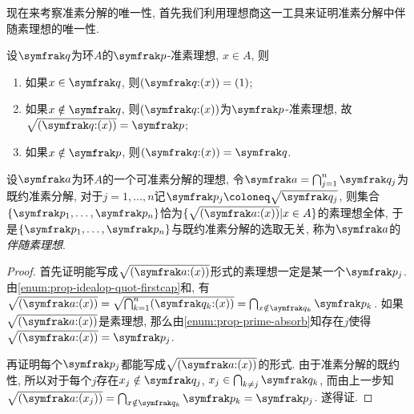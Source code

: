 现在来考察准素分解的唯一性, 首先我们利用理想商这一工具来证明准素分解中伴随素理想的唯一性.

\begin{propositionnoproof}\label{prop:idealquotprimary}
  设$\ideal{q}$为环$A$的$\ideal{p}$-准素理想, $x\in A$, 则
  \begin{enumerate}
    \item 如果$x\in \ideal{q}$, 则$(\ideal{q}{:}(x))=(1)$;
    \item 如果$x\notin\ideal{q}$, 则$(\ideal{q}{:}(x))$为$\ideal{p}$-准素理想, 故$\sqrt{(\ideal{q}{:}(x))}=\ideal{p}$;
    \item 如果$x\notin\ideal{p}$, 则$(\ideal{q}{:}(x))=\ideal{q}$.
  \end{enumerate}
\end{propositionnoproof}


\begin{theorem}\label{prop:primuniq1}
  设$\ideal{a}$为环$A$的一个可准素分解的理想, 令$\ideal{a}=\bigcap_{j=1}^n \ideal{q}_j$为既约准素分解, 对于$j=1, \dotsc, n$记$\ideal{p}_j\coloneq \sqrt{\ideal{q}_j}$, 则集合$\{\ideal{p}_1, \dotsc, \ideal{p}_n\}$恰为$\{\sqrt{(\ideal{a}{:}(x))}\vert x\in A\}$的素理想全体, 于是$\{\ideal{p}_1, \dotsc, \ideal{p}_n\}$与既约准素分解的选取无关, 称为$\ideal{a}$的\emph{伴随素理想}.
\end{theorem}

\begin{proof}
  首先证明能写成$\sqrt{(\ideal{a}{:}(x))}$形式的素理想一定是某一个$\ideal{p}_j$. 由\ref{enum:prop-idealop-quot-firstcap}和, 有$\sqrt{(\ideal{a}{:}(x))}=\sqrt{\bigcap_{k=1}^n(\ideal{q}_k{:}(x))}=\bigcap_{x\notin\ideal{q}_k}\ideal{p}_k$. 如果$\sqrt{(\ideal{a}{:}(x))}$是素理想, 那么由\ref{enum:prop-prime-absorb}知存在$j$使得$\sqrt{(\ideal{a}{:}(x))}=\ideal{p}_j$.

  再证明每个$\ideal{p}_j$都能写成$\sqrt{(\ideal{a}{:}(x))}$的形式. 由于准素分解的既约性, 所以对于每个$j$存在$x_j\notin\ideal{q}_j$, $x_j\in\bigcap_{k\neq j}\ideal{q}_k$, 而由上一步知$\sqrt{(\ideal{a}{:}(x_j))}=\bigcap_{x\notin\ideal{q}_k}\ideal{p}_k=\ideal{p}_j$. 遂得证.
\end{proof}

